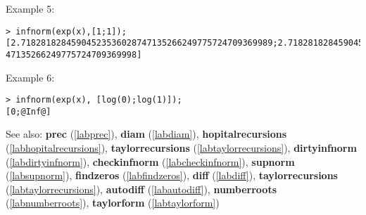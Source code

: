 \noindent Example 5: 
\begin{center}\begin{minipage}{15cm}\begin{Verbatim}[frame=single]
> infnorm(exp(x),[1;1]);
[2.71828182845904523536028747135266249775724709369989;2.718281828459045235360287
47135266249775724709369998]
\end{Verbatim}
\end{minipage}\end{center}
\noindent Example 6: 
\begin{center}\begin{minipage}{15cm}\begin{Verbatim}[frame=single]
> infnorm(exp(x), [log(0);log(1)]);
[0;@Inf@]
\end{Verbatim}
\end{minipage}\end{center}
See also: \textbf{prec} (\ref{labprec}), \textbf{diam} (\ref{labdiam}), \textbf{hopitalrecursions} (\ref{labhopitalrecursions}), \textbf{taylorrecursions} (\ref{labtaylorrecursions}), \textbf{dirtyinfnorm} (\ref{labdirtyinfnorm}), \textbf{checkinfnorm} (\ref{labcheckinfnorm}), \textbf{supnorm} (\ref{labsupnorm}), \textbf{findzeros} (\ref{labfindzeros}), \textbf{diff} (\ref{labdiff}), \textbf{taylorrecursions} (\ref{labtaylorrecursions}), \textbf{autodiff} (\ref{labautodiff}), \textbf{numberroots} (\ref{labnumberroots}), \textbf{taylorform} (\ref{labtaylorform})
